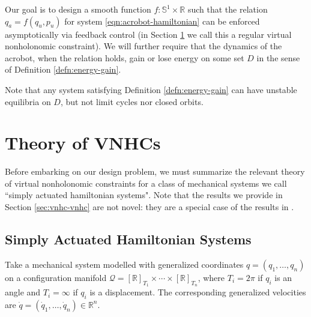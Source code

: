 \documentclass[journal,twoside,web, onecolumn, draftcls]{ieeecolor}
\newcommand*{\Rt}[1]{[\R]_{#1}}
\newcommand*{\R}{\mathbb{R}}
\newcommand*{\Sone}{\mathbb{S}^1}
\begin{document}
Our goal is to design a smooth function \(f : \Sone \times \R\) such that the
relation \(q_a = f(q_u,p_u)\) for system \eqref{eqn:acrobot-hamiltonian}
can be enforced asymptotically via feedback control (in Section \ref{sec:vnhc}
we call this a regular virtual nonholonomic constraint).  
We will further require that the dynamics of the acrobot, when the relation
holds, gain or lose energy on some set \(D\) in the sense of Definition
\ref{defn:energy-gain}. 

Note that any system satisfying Definition \ref{defn:energy-gain}
can have unstable equilibria on \(D\), but not limit cycles nor closed orbits.

\section{Theory of VNHCs}\label{sec:vnhc}
Before embarking on our design problem, we must summarize the relevant
theory of virtual nonholonomic constraints for a class of mechanical systems we
call ``simply actuated hamiltonian systems". 
Note that the results we provide in Section \ref{sec:vnhc-vnhc} are not novel:
they are a special case of the results in
\cite{hybrid_zero_dynamics_bipedal_nhvcs}.

\subsection{Simply Actuated Hamiltonian Systems} \label{sec:vnhc-sah}
Take a mechanical system modelled with generalized coordinates 
\(q = (q_1, \ldots, q_n)\) on a configuration manifold
\(\mathcal{Q} = \Rt{T_1} \times \cdots \times \Rt{T_n}\), where
\(T_i = 2\pi\) if \(q_i\) is an angle and \(T_i = \infty\) if \(q_i\) is a
displacement. The corresponding generalized velocities are 
\(\dot{q} = (\dot{q}_1,\ldots,\dot{q}_n) \in \R^n\).
\end{document}
